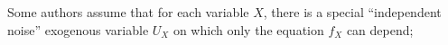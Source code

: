 Some authors assume that 
for each variable $X$, there is a special
``independent noise'' exogenous variable 
$U_X$
%
on which only the equation $f_X$ can depend;
